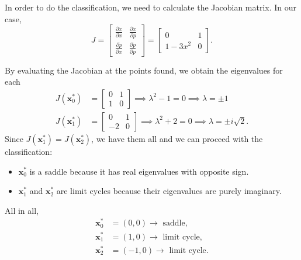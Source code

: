 In order to do the classification, we need to 
calculate the Jacobian matrix. In our case,
\[
    J = \begin{bmatrix}
        \displaystyle\frac{\partial \dot{x}}{\partial x} & \displaystyle\frac{\partial \dot{x}}{\partial p}\\[2.5ex]
        \displaystyle\frac{\partial \dot{p}}{\partial x} & \displaystyle\frac{\partial \dot{p}}{\partial p}
    \end{bmatrix} =
    \begin{bmatrix}
        0 & 1\\
        1 - 3x^2 & 0
    \end{bmatrix}.
\]

By evaluating the Jacobian at the points found, we obtain the
eigenvalues for each
\[
    \begin{aligned}
        J(\textbf{x}_0^*) &= \begin{bmatrix}
            0 & 1\\
            1 & 0
        \end{bmatrix} \implies \lambda^2 - 1 = 0 \implies \lambda = \pm 1\\
        J(\textbf{x}_1^*) &= \begin{bmatrix}
            0 & 1\\
            -2 & 0
        \end{bmatrix} \implies \lambda^2 +2=0 \implies \lambda = \pm i\sqrt{2}.
    \end{aligned}
\]
Since $J(\textbf{x}_1^*) = J(\textbf{x}_2^*)$, we have them all and
we can proceed with the classification:

\begin{itemize}[label=\textbf{--}]
    \item $\textbf{x}_0^*$ is a saddle because it has real eigenvalues
    with opposite sign.
    \item $\textbf{x}_1^*$ and $\textbf{x}_2^*$ are limit cycles because
    their eigenvalues are purely imaginary.
\end{itemize}

All in all,
\[
\boxed{
    \begin{aligned}
        \textbf{x}_0^* &= (0, 0) \rightarrow \text{ saddle},\\
        \textbf{x}_1^* &= (1, 0) \rightarrow \text{ limit cycle},\\
        \textbf{x}_2^* &= (-1, 0) \rightarrow \text{ limit cycle}.
    \end{aligned}
}
\]



